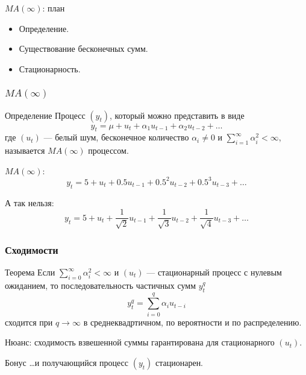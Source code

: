 
\begin{frame} %


\end{frame}



\begin{frame}{$MA(\infty)$: план}
  \begin{itemize}[<+->]
    \item Определение.
    \item Существование бесконечных сумм. 
    \item Стационарность.
  \end{itemize}
\end{frame}

\begin{frame}
  \frametitle{$MA(\infty)$}

  \begin{block}{Определение}
    Процесс $(y_t)$, который \alert{можно} представить в виде
    \[
    y_t = \mu + u_t + \alpha_1 u_{t-1} + \alpha_2 u_{t-2} + \ldots
    \]
    где $(u_t)$ — белый шум, бесконечное количество $\alpha_i \neq 0$ и 
    $\sum_{i=1}^{\infty} \alpha_i^2 < \infty$, 
    называется $MA(\infty)$ процессом. 
  \end{block}

  \pause 
  $MA(\infty)$:
  \[
  y_t = 5 + u_t + 0.5 u_{t-1} + 0.5^2 u_{t-2} + 0.5^3 u_{t-3} + \ldots
  \]

  \pause
  А \alert{так нельзя}:
  \[
   y_t = 5 + u_t + \frac{1}{\sqrt{2}}u_{t-1} + \frac{1}{\sqrt{3}} u_{t-2} + \frac{1}{\sqrt{4}} u_{t-3} + \ldots
  \]

\end{frame}

\begin{frame}
  \frametitle{Сходимости}
  \begin{block}{Теорема}
    Если 
    $\sum_{i=0}^{\infty} \alpha_i^2 < \infty$ и $(u_t)$ — стационарный процесс с нулевым ожиданием, 
    то последовательность частичных сумм $y^q_t$
    \[
      y^q_t = \sum_{i=0}^q \alpha_i u_{t-i}
    \]
  сходится при $q \to \infty$  \alert{в среднеквадртичном}, \alert{по вероятности} и \alert{по распределению}.
  \end{block}

  Нюанс: сходимость взвешенной суммы гарантирована для стационарного $(u_t)$.  
  \pause
  \begin{block}{Бонус}
    \ldots и получающийся процесс $(y_t)$ стационарен.
  \end{block}
\end{frame}


